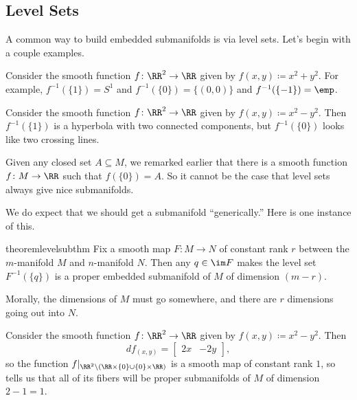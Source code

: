 \documentclass[../notes.tex]{subfiles}
\begin{document}
\subsection{Level Sets}
A common way to build embedded submanifolds is via level sets. Let's begin with a couple examples.
\begin{example}
	Consider the smooth function $f\colon\RR^2\to\RR$ given by $f(x,y)\coloneqq x^2+y^2$. For example, $f^{-1}(\{1\})=S^1$ and $f^{-1}(\{0\})=\{(0,0)\}$ and $f^{-1}(\{-1\})=\emp$.
\end{example}
\begin{example}
	Consider the smooth function $f\colon\RR^2\to\RR$ given by $f(x,y)\coloneqq x^2-y^2$. Then $f^{-1}(\{1\})$ is a hyperbola with two connected components, but $f^{-1}(\{0\})$ looks like two crossing lines.
\end{example}
\begin{remark}
	Given any closed set $A\subseteq M$, we remarked earlier that there is a smooth function $f\colon M\to\RR$ such that $f(\{0\})=A$. So it cannot be the case that level sets always give nice submanifolds.
\end{remark}
We do expect that we should get a submanifold ``generically.'' Here is one instance of this.
\begin{restatable}{theorem}{levelsubthm} \label{thm:level-sub}
	Fix a smooth map $F\colon M\to N$ of constant rank $r$ between the $m$-manifold $M$ and $n$-manifold $N$. Then any $q\in\im F$ makes the level set $F^{-1}(\{q\})$ is a proper embedded submanifold of $M$ of dimension $(m-r)$.
\end{restatable}
\noindent Morally, the dimensions of $M$ must go somewhere, and there are $r$ dimensions going out into $N$.
\begin{example} \label{ex:almost-submersion}
	Consider the smooth function $f\colon\RR^2\to\RR$ given by $f(x,y)\coloneqq x^2-y^2$. Then
	\[df_{(x,y)}=\begin{bmatrix}
		2x & -2y
	\end{bmatrix},\]
	so the function $f|_{\RR^2\setminus(\RR\times\{0\}\cup\{0\}\times\RR)}$ is a smooth map of constant rank $1$, so  tells us that all of its fibers will be proper submanifolds of $M$ of dimension $2-1=1$.
\end{example}
\end{document}
